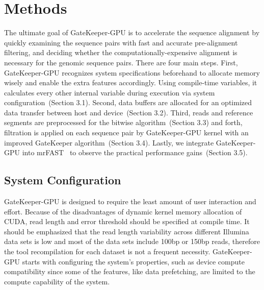 \section{Methods}
The ultimate goal of GateKeeper-GPU is to accelerate the sequence alignment by quickly examining the sequence pairs with fast and accurate pre-alignment filtering, and deciding whether the computationally-expensive alignment is necessary for the genomic sequence pairs. There are four main steps. First, GateKeeper-GPU recognizes system specifications beforehand to allocate memory wisely and enable the extra features accordingly. Using compile-time variables, it calculates every other internal variable during execution via system configuration~(Section 3.1). Second, data buffers are allocated for an optimized data transfer between host and device~(Section 3.2). Third, reads and reference segments are preprocessed for the bitwise algorithm~(Section 3.3) and forth, filtration is applied on each sequence pair by GateKeeper-GPU kernel with an improved GateKeeper algorithm~(Section 3.4). Lastly, we integrate GateKeeper-GPU into mrFAST~\cite{alkan2009personalized} to observe the practical performance gains~(Section 3.5). 

\subsection{System Configuration}
GateKeeper-GPU is designed to require the least amount of user interaction and effort. Because of the disadvantages of dynamic kernel memory allocation of CUDA, read length and error threshold should be specified at compile time. It should be emphasized that the read length variability across different Illumina data sets is low and most of the data sets include 100bp or 150bp reads, therefore the tool recompilation for each dataset is not a frequent necessity.
GateKeeper-GPU starts with configuring the system's properties, such as device compute compatibility since some of the features, like data prefetching, are limited to the compute capability of the system.


